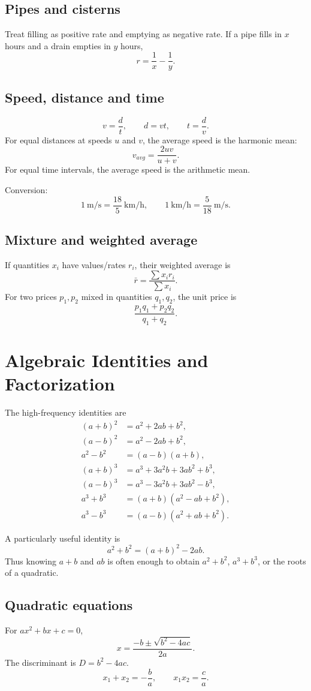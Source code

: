 \documentclass[12pt,a4paper,oneside]{book}
\begin{document}
\section{Pipes and cisterns}
Treat filling as positive rate and emptying as negative rate. If a pipe fills in \(x\) hours and a drain empties in \(y\) hours,
\[r=\frac1x-\frac1y.\]

\section{Speed, distance and time}
\[v=\frac dt,\qquad d=vt,\qquad t=\frac dv.\]
For equal distances at speeds \(u\) and \(v\), the average speed is the harmonic mean:
\[v_{avg}=\frac{2uv}{u+v}.\]
For equal time intervals, the average speed is the arithmetic mean.

Conversion:
\[1\ \mathrm{m/s}=\frac{18}{5}\ \mathrm{km/h},\qquad 1\ \mathrm{km/h}=\frac5{18}\ \mathrm{m/s}.\]

\section{Mixture and weighted average}
If quantities \(x_i\) have values/rates \(r_i\), their weighted average is
\[\bar r=\frac{\sum x_ir_i}{\sum x_i}.\]
For two prices \(p_1,p_2\) mixed in quantities \(q_1,q_2\), the unit price is
\[\frac{p_1q_1+p_2q_2}{q_1+q_2}.\]

\chapter[Identities and Factorization]{Algebraic Identities and Factorization}
The high-frequency identities are
\begin{align*}
(a+b)^2&=a^2+2ab+b^2,\\
(a-b)^2&=a^2-2ab+b^2,\\
a^2-b^2&=(a-b)(a+b),\\
(a+b)^3&=a^3+3a^2b+3ab^2+b^3,\\
(a-b)^3&=a^3-3a^2b+3ab^2-b^3,\\
a^3+b^3&=(a+b)(a^2-ab+b^2),\\
a^3-b^3&=(a-b)(a^2+ab+b^2).
\end{align*}

A particularly useful identity is
\[a^2+b^2=(a+b)^2-2ab.\]
Thus knowing \(a+b\) and \(ab\) is often enough to obtain \(a^2+b^2\), \(a^3+b^3\), or the roots of a quadratic.

\section{Quadratic equations}
For \(ax^2+bx+c=0\),
\[x=\frac{-b\pm\sqrt{b^2-4ac}}{2a}.\]
The discriminant is \(D=b^2-4ac\).
\[x_1+x_2=-\frac ba,\qquad x_1x_2=\frac ca.\]
\end{document}
